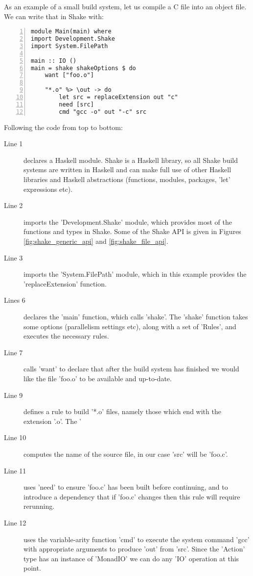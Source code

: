 As an example of a small build system, let us compile a C file into an object file. We can write that in Shake with:

\begin{lstlisting}[numbers=left,xleftmargin=2em,framexleftmargin=1.5em]
module Main(main) where
import Development.Shake
import System.FilePath

main :: IO ()
main = shake shakeOptions $ do
    want ["foo.o"]

    "*.o" %> \out -> do
        let src = replaceExtension out "c"
        need [src]
        cmd "gcc -o" out "-c" src
\end{lstlisting}

Following the code from top to bottom:

\begin{description}
\item[Line 1] declares a Haskell module. Shake is a Haskell library, so all Shake build systems are written in Haskell and can make full use of other Haskell libraries and Haskell abstractions (functions, modules, packages, \lst'let' expressions etc).
\item[Line 2] imports the \lst'Development.Shake' module, which provides most of the functions and types in Shake. Some of the Shake API is given in Figures \ref{fig:shake_generic_api} and \ref{fig:shake_file_api}.
\item[Line 3] imports the \lst'System.FilePath' module, which in this example provides the \lst'replaceExtension' function.
\item[Lines 6] declares the \lst'main' function, which calls \lst'shake'. The \lst'shake' function takes some options (parallelism settings etc), along with a set of \lst'Rules', and executes the necessary rules.
\item[Line 7] calls \lst'want' to declare that after the build system has finished we would like the file \lst'foo.o' to be available and up-to-date.
\item[Line 9] defines a rule to build \lst'*.o' files, namely those which end with the extension \lst'.o'. The \lst'%
\item[Line 10] computes the name of the source file, in our case \lst'src' will be \lst'foo.c'.
\item[Line 11] uses \lst'need' to ensure \lst'foo.c' has been built before continuing, and to introduce a dependency that if \lst'foo.c' changes then this rule will require rerunning.
\item[Line 12] uses the variable-arity function \lst'cmd' to execute the system command \lst'gcc' with appropriate arguments to produce \lst'out' from \lst'src'. Since the \lst'Action' type has an instance of \lst'MonadIO' we can do any \lst'IO' operation at this point.
\end{description}

